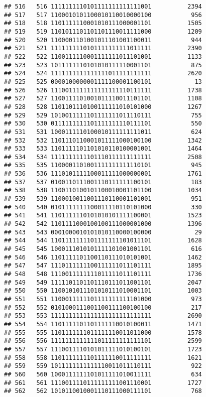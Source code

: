 \documentclass[]{article}
\begin{document}
\begin{verbatim}
## 516   516 1111111110101111111111111001          2394
## 517   517 1100010101100010110010000100           956
## 518   518 1101111110001010111000001101          1505
## 519   519 1101011101101101110011111000          1209
## 520   520 1100001101001011101001100011           944
## 521   521 1111111110101111111111011111          2390
## 522   522 1100111110001111111011101001          1133
## 523   523 1011111110101010111110001101           875
## 524   524 1111111111111111011111111111          2620
## 525   525 0000100000001111100001100101            13
## 526   526 1110011111111111111110111111          1738
## 527   527 1100111101001011110011101101          1108
## 528   528 1101101110100111111010101000          1267
## 529   529 1010011111101111111011110111           755
## 530   530 0111111111101111111110111101           550
## 531   531 1000111110100010111111111011           624
## 532   532 1101110110001011111000100100          1342
## 533   533 1101111101101010110100001001          1464
## 534   534 1111111111101110111111111111          2508
## 535   535 1100001101001111111111110101           945
## 536   536 1110101111100011111000000001          1761
## 537   537 0100110111001110111111100101           183
## 538   538 1100110100101100010001101100          1034
## 539   539 1100010011001110110001101001           951
## 540   540 0101111111100011110110101000           330
## 541   541 1101111110101010101111100001          1523
## 542   542 1101111000100100111000001000          1396
## 543   543 0001000010101010110000100000            29
## 544   544 1101111111101111111101011101          1628
## 545   545 1000111010101111101001001101           616
## 546   546 1101111101100110111010101001          1462
## 547   547 1110111111100111111011101111          1895
## 548   548 1110011111111011111011101111          1736
## 549   549 1111101101101110111011001101          2047
## 550   550 1100101011101010111010001101          1003
## 551   551 1100011111101111111111101000           973
## 552   552 0101000111001100111100100100           217
## 553   553 1111111111111111111111111111          2690
## 554   554 1101111101101111110010100011          1471
## 555   555 1101111111011111110011011000          1578
## 556   556 1111111111111011111111111101          2599
## 557   557 1110011110101011111010100101          1723
## 558   558 1101111111101111110011111111          1621
## 559   559 1011111111111110011011110111           922
## 560   560 1000111111101011111010011111           634
## 561   561 1110011110111111111001110001          1727
## 562   562 1010110010001110111000111101           768

\end{verbatim}
\end{document}
